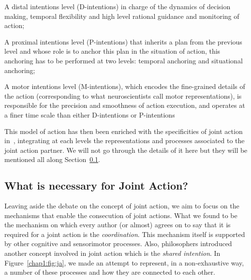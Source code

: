\documentclass[a4paper,11pt,twoside]{StyleThese}
\begin{document}
\begin{bulletList}
	\item A distal intentions level (D-intentions) in charge of the dynamics of decision making, temporal flexibility and high level rational guidance and monitoring of action;
	\item A proximal intentions level (P-intentions) that inherits a plan from the previous level and whose role is to anchor this plan in the situation of action, this anchoring has to be performed at two levels: temporal anchoring and situational anchoring;
	\item A motor intentions level (M-intentions), which encodes the fine-grained details of the action (corresponding to what neuroscientists call motor representations), is responsible for the precision and smoothness of action execution, and operates at a finer time scale than either D-intentions or P-intentions
\end{bulletList}

This model of action has then been enriched with the specificities of joint action in~\cite{pacherie_2012_agency}, integrating at each levels the representations and processes associated to the joint action partner. We will not go through the details of it here but they will be mentioned all along Section~\ref{chap1:subsec:necess_ja}.

\subsection{What is necessary for Joint Action?}\label{chap1:subsec:necess_ja}

Leaving aside the debate on the concept of joint action, we aim to focus on the mechanisms that enable the consecution of joint actions. What we found to be the mechanism on which every author (or almost) agrees on to say that it is required for a joint action is the \textit{coordination}. This mechanism itself is supported by other cognitive and sensorimotor processes. Also, philosophers introduced another concept involved in joint action which is the \textit{shared intention}. In Figure~\ref{chap1:fig:ja}, we made an attempt to represent, in a non-exhaustive way, a number of these processes and how they are connected to each other.
\end{document}
